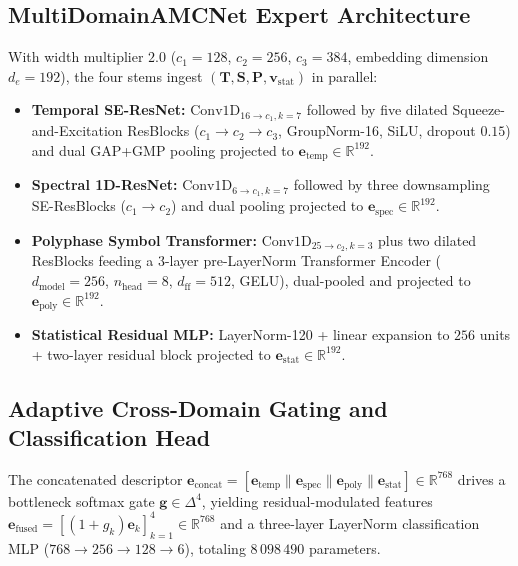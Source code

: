 \subsection{MultiDomainAMCNet Expert Architecture}
\label{subsec:expert_architecture}

With width multiplier $2.0$ ($c_1 = 128$, $c_2 = 256$, $c_3 = 384$, embedding dimension $d_e = 192$), the four stems ingest $(\mathbf{T}, \mathbf{S}, \mathbf{P}, \mathbf{v}_{\text{stat}})$ in parallel:
\begin{itemize}
    \item \textbf{Temporal SE-ResNet:} $\text{Conv1D}_{16 \to c_1, k=7}$ followed by five dilated Squeeze-and-Excitation ResBlocks ($c_1 \to c_2 \to c_3$, GroupNorm-16, SiLU, dropout $0.15$) and dual GAP+GMP pooling projected to $\mathbf{e}_{\text{temp}} \in \mathbb{R}^{192}$.
    \item \textbf{Spectral 1D-ResNet:} $\text{Conv1D}_{6 \to c_1, k=7}$ followed by three downsampling SE-ResBlocks ($c_1 \to c_2$) and dual pooling projected to $\mathbf{e}_{\text{spec}} \in \mathbb{R}^{192}$.
    \item \textbf{Polyphase Symbol Transformer:} $\text{Conv1D}_{25 \to c_2, k=3}$ plus two dilated ResBlocks feeding a 3-layer pre-LayerNorm Transformer Encoder ($d_{\text{model}} = 256$, $n_{\text{head}} = 8$, $d_{\text{ff}} = 512$, GELU), dual-pooled and projected to $\mathbf{e}_{\text{poly}} \in \mathbb{R}^{192}$.
    \item \textbf{Statistical Residual MLP:} LayerNorm-120 + linear expansion to $256$ units + two-layer residual block projected to $\mathbf{e}_{\text{stat}} \in \mathbb{R}^{192}$.
\end{itemize}

\subsection{Adaptive Cross-Domain Gating and Classification Head}
\label{subsec:cross_domain_gating}

The concatenated descriptor $\mathbf{e}_{\text{concat}} = [\mathbf{e}_{\text{temp}} \parallel \mathbf{e}_{\text{spec}} \parallel \mathbf{e}_{\text{poly}} \parallel \mathbf{e}_{\text{stat}}] \in \mathbb{R}^{768}$ drives a bottleneck softmax gate $\mathbf{g} \in \Delta^4$, yielding residual-modulated features $\mathbf{e}_{\text{fused}} = [(1+g_k)\mathbf{e}_k]_{k=1}^4 \in \mathbb{R}^{768}$ and a three-layer LayerNorm classification MLP ($768 \to 256 \to 128 \to 6$), totaling $8\,098\,490$ parameters.


